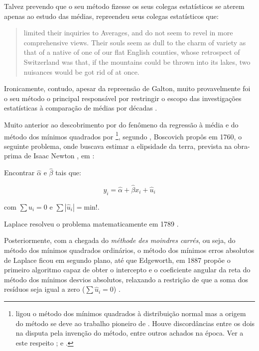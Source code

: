 \documentclass[a4paper, 12pt]{article}
\let\rmarkdownfootnote\footnote%
\def\footnote{\protect\rmarkdownfootnote}
\begin{document}
Talvez prevendo que o seu método fizesse os seus colegas estatísticos se
aterem apenas ao estudo das médias, \textcite[p.~62]{galton}
\autocite[\emph{apud}][p.~350]{koenker2000} repreendeu seus colegas
estatísticos que:

\begin{quote}
limited their inquiries to Averages, and do not seem to revel in more
comprehensive views. Their souls seem as dull to the charm of variety as
that of a native of one of our flat English counties, whose retrospect
of Switzerland was that, if the mountains could be thrown into its
lakes, two nuisances would be got rid of at once.
\end{quote}

Ironicamente, contudo, apesar da repreensão de Galton, muito
provavelmente foi o seu método o principal responsável por restringir o
escopo das investigações estatísticas à comparação de médias por décadas
\autocite[350]{koenker2000}.

Muito anterior ao descobrimento por \textcite{galton} do fenômeno da
regressão à média e do método dos mínimos quadrados por
\textcite{legendre1805} \footnote{\textcite{gauss1809} ligou o método
  dos mínimos quadrados à distribuição normal mas a origem do método se
  deve ao trabalho pioneiro de \textcite{legendre1805}. Houve
  discordâncias entre os dois na disputa pela invenção do método, entre
  outros achados na época. Ver a este respeito \textcite{STIGLER197731};
  \textcite{stigler1981} e \textcite{stigler1986}.}, segundo
\textcite[p.~281]{tortoise}, Boscovich propôs em 1760, o seguinte
problema, onde buscava estimar a elipsidade da terra, prevista na
obra-prima de Isaac Newton \autocite*{newton}, em :

Encontrar \(\hat \alpha\) e \(\hat \beta\) tais que:

\[y_i = \hat \alpha + \hat \beta x_i + \hat u_i\]

com \(\sum \hat u_i = 0\) e \(\sum |\hat u_i| = \text{min!}\).

Laplace resolveu o problema matematicamente em 1789
\autocite[281]{tortoise}.

Posteriormente, com a chegada do \emph{méthode des moindres carrés}, ou
seja, do método dos mínimos quadrados ordinários, o método dos mínimos
erros absolutos de Laplace ficou em segundo plano, até que Edgeworth, em
1887 propõe o primeiro algoritmo capaz de obter o intercepto e o
coeficiente angular da reta do método dos mínimos desvios absolutos,
relaxando a restrição de que a soma dos resíduos seja igual a zero
(\(\sum \hat u_i = 0\)) \autocite[281]{tortoise}.
\end{document}
